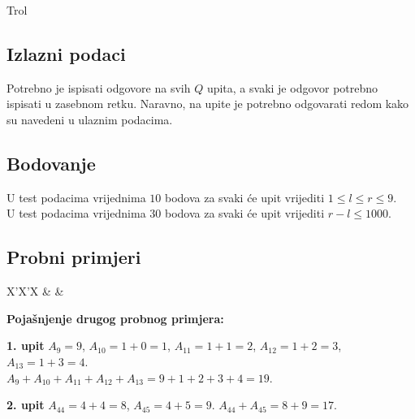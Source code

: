 \begin{statement}[
  problempoints=50,
  timelimit=1 sekunda,
  memorylimit=512 MiB,
]{Trol}
\subsection*{Izlazni podaci}
Potrebno je ispisati odgovore na svih $Q$ upita, a svaki je odgovor potrebno
ispisati u zasebnom retku. Naravno, na upite je potrebno odgovarati redom kako
su navedeni u ulaznim podacima.

\subsection*{Bodovanje}
U test podacima vrijednima $10$ bodova za svaki će upit vrijediti
$1 \le l \le r \le 9$. \\
U test podacima vrijednima $30$ bodova za svaki će upit vrijediti
$r - l \le 1000$.

\subsection*{Probni primjeri}
\begin{tabularx}{\textwidth}{X'X'X}
 &
 &
\end{tabularx}

\textbf{Pojašnjenje drugog probnog primjera:}

\textbf{1. upit} \textrightarrow{}
$A_9 = 9$, $A_{10} = 1 + 0 = 1$, $A_{11} = 1 + 1 = 2$,
$A_{12} = 1 + 2 = 3$, $A_{13} = 1 + 3 = 4$.\\
$A_9 + A_{10} + A_{11} + A_{12} + A_{13} = 9 + 1 + 2 + 3 + 4 = 19$.

\textbf{2. upit} \textrightarrow{}
$A_{44} = 4 + 4 = 8$, $A_{45} = 4 + 5 = 9$. $A_{44} + A_{45} = 8 + 9 = 17$.

\end{statement}

